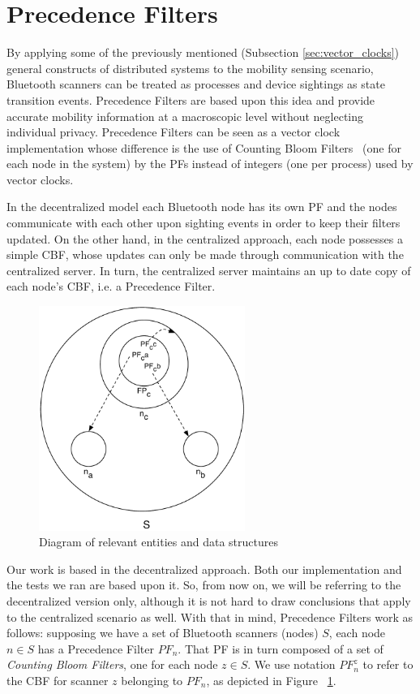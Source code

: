 \section{Precedence Filters}
\label{sec:precedence-filters}
By applying some of the previously mentioned (Subsection
\ref{sec:vector_clocks}) general constructs of distributed systems to
the mobility sensing scenario, Bluetooth scanners can be treated as
processes and device sightings as state transition events. Precedence
Filters are based upon this idea and provide accurate mobility
information at a macroscopic level without neglecting individual
privacy.  Precedence Filters can be seen as a vector clock
\cite{Fidge,Mattern} implementation whose difference is the use of
Counting Bloom Filters~\cite{Fan98summarycache:,Mitzenmacher:2002:CBF:581876.581878} (one for each node in the system) by the PFs
instead of integers (one per process) used by vector clocks.

In the decentralized model each Bluetooth node has its own PF and the
nodes communicate with each other upon sighting events in order to
keep their filters updated. On the other hand, in the centralized
approach, each node possesses a simple CBF, whose updates can only be
made through communication with the centralized server. In turn, the
centralized server maintains an up to date copy of each node's CBF,
i.e. a Precedence Filter.

\begin{figure}
  \centering
  \includegraphics[width=0.60\textwidth]{images/precedence_filters.pdf}
  \caption{Diagram of relevant entities and data structures}
  \label{fig:precedence_filters}
\end{figure}

Our work is based in the decentralized approach. Both our
implementation and the tests we ran are based upon it. So,
from now on, we will be referring to the decentralized version only,
although it is not hard to draw conclusions that apply to the
centralized scenario as well.
With that in mind, Precedence Filters work as follows: supposing we
have a set of Bluetooth scanners (nodes) $S$, each node $n \in S$ has
a Precedence Filter $PF_n$. That PF is in turn composed of a set of
\emph{Counting Bloom Filters}, one for each node $z \in S$. We use
notation $PF_n^z$ to refer to the CBF for scanner $z$ belonging to
$PF_n$, as depicted in Figure ~\ref{fig:precedence_filters}.


